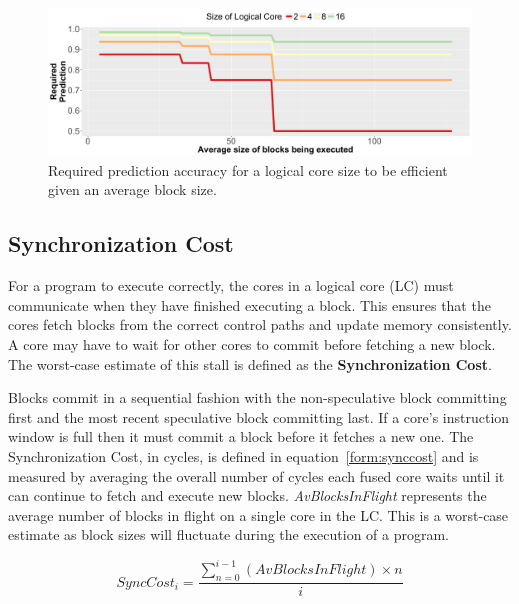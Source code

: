 \begin{figure}[h]
    \centering
    \includegraphics[width=\textwidth]{cases-paper/graphics/limit_study/prediction_req.pdf}
    \caption{Required prediction accuracy for a logical core size to be efficient given an average block size.}
    \label{fig:req_pred}
\end{figure}
\subsection{Synchronization Cost}


For a program to execute correctly, the cores in a logical core (LC) must communicate when they have finished executing a block. 
This ensures that the cores fetch blocks from the correct control paths and update memory consistently.
A core may have to wait for other cores to commit before fetching a new block. 
The worst-case estimate of this stall is defined as the \textbf{Synchronization Cost}.

Blocks commit in a sequential fashion with the non-speculative block committing first and the most recent speculative block committing last.
If a core's instruction window is full then it must commit a block before it fetches a new one.
The Synchronization Cost, in cycles, is defined in equation~\ref{form:synccost} and is measured by averaging the overall number of cycles each fused core waits until it can continue to fetch and execute new blocks.
\textit{AvBlocksInFlight} represents the average number of blocks in flight on a single core in the LC.
This is a worst-case estimate as block sizes will fluctuate during the execution of a program.

\begin{equation}\label{form:synccost}
SyncCost_i = \frac{\sum_{n=0}^{i-1}\left(AvBlocksInFlight \right) \times n }{i}
\end{equation}


